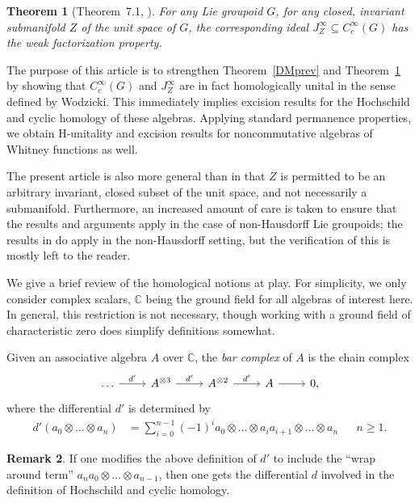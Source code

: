 \documentclass[12pt]{article}
\theoremstyle{plain}
\newtheorem{thm}{Theorem}[section]
\theoremstyle{definition}
\newtheorem{rmk}[thm]{Remark}
\newcommand{\C}{\mathbb{C}}
\numberwithin{equation}{section}
\begin{document}
\begin{thm}[Theorem~7.1, \cite{Francis[DM]}]\label{idealDM}
For any Lie groupoid $G$, for any closed, invariant submanifold $Z$ of the unit space of $G$, the corresponding ideal $J_Z^\infty \subseteq  C_c^\infty(G)$ has the weak factorization property. 
\end{thm}



The purpose of this article is to strengthen Theorem~\ref{DMprev} and Theorem~\ref{idealDM} by showing that $C_c^\infty(G)$ and $J^\infty_Z$ are in fact  homologically unital in the sense defined by Wodzicki.  This immediately implies excision results for the Hochschild and cyclic homology of these algebras.   Applying standard permanence properties, we obtain H-unitality and excision results for noncommutative algebras of Whitney functions as well. 


The present article is also more general than \cite{Francis[DM]} in that $Z$ is permitted to  be an arbitrary  invariant, closed subset of the unit space, and not necessarily a submanifold. Furthermore, an increased amount of care is taken to ensure that the results and arguments apply in the case of non-Hausdorff Lie groupoids; the results in \cite{Francis[DM]} do apply in the non-Hausdorff setting, but the verification of this is mostly left to the reader.


We give a brief review of the homological notions at play. For simplicity, we only consider complex scalars,  $\C$ being the ground field for all algebras of interest here. In general, this restriction is not necessary, though working with a ground field of characteristic zero does simplify definitions somewhat.

Given an associative algebra $A$ over $\C$, the \emph{bar complex} of $A$ is the chain complex
\[ 
\begin{tikzcd}
\ldots \ar[r,"{d'}"]  & A^{\otimes 3} \ar[r,"{d'}"] & A^{\otimes 2} \ar[r,"{d'}"] & A \ar[r] & 0, 
\end{tikzcd}\]
where the differential $d'$ is determined by
\begin{align*}
d'(a_0\otimes\ldots\otimes a_n) &= \sum_{i=0}^{n-1}  (-1)^i a_0 \otimes \ldots \otimes a_ia_{i+1} \otimes \ldots \otimes a_n &&  n \geq 1.
\end{align*}


\begin{rmk}
If one modifies the above definition of $d'$  to include the ``wrap around term'' $a_n a_0 \otimes \ldots \otimes a_{n-1}$, then one gets the differential  $d$ involved in the definition of Hochschild and cyclic homology. 
\end{rmk}
\end{document}
